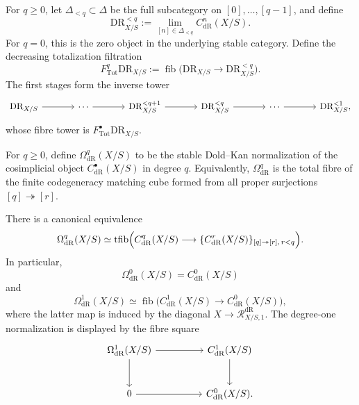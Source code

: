 For \(q\geq0\), let \(\Delta_{<q}\subset\Delta\) be the full subcategory on
\([0],\ldots,[q-1]\), and define
\[
  \mathrm{DR}^{<q}_{X/S}
  :=
  \operatorname*{lim}_{[n]\in\Delta_{<q}}
  C^n_{\mathrm{dR}}(X/S).
\]
For \(q=0\), this is the zero object in the underlying stable category. Define the
decreasing totalization filtration
\[
  F^q_{\mathrm{Tot}}\mathrm{DR}_{X/S}
  :=
  \operatorname{fib}
  \bigl(
    \mathrm{DR}_{X/S}
    \longrightarrow
    \mathrm{DR}^{<q}_{X/S}
  \bigr).
\]
The first stages form the inverse tower
\[
\begin{tikzcd}[column sep=large]
  \mathrm{DR}_{X/S}
    \arrow[r]
  & \cdots \arrow[r]
  & \mathrm{DR}^{<q+1}_{X/S}
    \arrow[r]
  & \mathrm{DR}^{<q}_{X/S}
    \arrow[r]
  & \cdots \arrow[r]
  & \mathrm{DR}^{<1}_{X/S},
\end{tikzcd}
\]
whose fibre tower is \(F^\bullet_{\mathrm{Tot}}\mathrm{DR}_{X/S}\).


\begin{definition}
For \(q\geq0\), define \(\Omega^q_{\mathrm{dR}}(X/S)\) to be the stable
Dold--Kan normalization of the cosimplicial object
\(C^\bullet_{\mathrm{dR}}(X/S)\) in degree \(q\). Equivalently,
\(\Omega^q_{\mathrm{dR}}\) is the total fibre of the finite codegeneracy matching cube
formed from all proper surjections \([q]\twoheadrightarrow[r]\).
\end{definition}

\begin{proposition}
\label{prop:explicit-normalization-expanded}
There is a canonical equivalence
\[
  \Omega^q_{\mathrm{dR}}(X/S)
  \simeq
  \operatorname{tfib}
  \Bigl(
  C^q_{\mathrm{dR}}(X/S)
  \longrightarrow
  \{C^r_{\mathrm{dR}}(X/S)\}_{[q]\twoheadrightarrow[r],\,r<q}
  \Bigr).
\]
In particular,
\[
  \Omega^0_{\mathrm{dR}}(X/S)=C^0_{\mathrm{dR}}(X/S)
\]
and
\[
  \Omega^1_{\mathrm{dR}}(X/S)
  \simeq
  \operatorname{fib}
  \bigl(C^1_{\mathrm{dR}}(X/S)\to C^0_{\mathrm{dR}}(X/S)\bigr),
\]
where the latter map is induced by the diagonal \(X\to \mathcal R^{\mathrm{dR}}_{X/S,1}\).
The degree-one normalization is displayed by the fibre square
\[
\begin{tikzcd}[column sep=huge,row sep=large]
  \Omega^1_{\mathrm{dR}}(X/S) \arrow[r] \arrow[d]
  & C^1_{\mathrm{dR}}(X/S) \arrow[d]
  \\
  0 \arrow[r]
  & C^0_{\mathrm{dR}}(X/S).
\end{tikzcd}
\]
\end{proposition}


